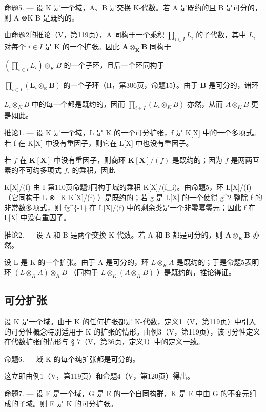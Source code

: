 命题5. --- 设 K 是一个域，A、B 是交换 K-代数。若 A 是既约的且 B 是可分的，则 A ⊗K B 是既约的。

由命题2的推论（V，第119页），A 同构于一个乘积 \(\prod_{i\in I}L_i\) 的子代数，其中 \(L_{i}\) 对每个 \(i\in I\) 是 K 的一个扩张。因此 \(\mathbf{A}\otimes_{\mathbf{K}}\mathbf{B}\) 同构于

\(\left(\prod_{i\in I}L_i\right)\otimes_K B\) 的一个子环，且后一个环同构于

\(\prod_{i\in I}(\mathbf{L}_i\otimes_{\mathbb{K}}\mathbf{B})\) 的一个子环（II，第306页，命题15）。由于 \(\mathbf{B}\) 是可分的，诸环

\(L_{i} \otimes_{K} B\) 中的每一个都是既约的，因而 \(\prod_{i \in I} (L_{i} \otimes_{K} B)\) 亦然，从而 \(A \otimes_{K} B\) 更是如此。

推论1. --- 设 K 是一个域，L 是 K 的一个可分扩张，f 是 K{[}X{]} 中的一个多项式。若 f 在 K{[}X{]} 中没有重因子，则它在 L{[}X{]} 中也没有重因子。

若 \(f\) 在 \(\mathbf{K}[\mathbf{X}]\) 中没有重因子，则商环 \(\mathbf{K}[\mathbf{X}] / (f)\) 是既约的；因为 \(f\) 是两两互素的不可约多项式 \(f_i\) 的乘积，因此

K{[}X{]}/(f) 由 I 第110页命题9同构于域的乘积 K{[}X{]}/(f\_i)。由命题5，环 L{[}X{]}/(f) （它同构于 L ⊗\_K K{[}X{]}/(f) ）是既约的；若 g 是 L{[}X{]} 的一个使得 g\^{}2 整除 f 的非常数多项式，则 fg\^{}\{-1\} 在 L{[}X{]}/(f) 中的剩余类是一个非零幂零元；因此 f 在 L{[}X{]} 中没有重因子。

推论2. --- 设 A 和 B 是两个交换 K-代数。若 A 和 B 都是可分的，则 \(\mathbf{A} \otimes_{\mathbf{K}} \mathbf{B}\) 亦然。

设 L 是 K 的一个扩张。由于 A 是可分的，环 \(L \otimes_{K} A\) 是既约的；于是命题5表明环 \((L \otimes_{K} A) \otimes_{K} B\) （同构于 \(L \otimes_{K} (A \otimes_{K} B)\) ）是既约的，推论得证。

\subsection{可分扩张}

设 K 是一个域。由于 K 的任何扩张都是 K-代数，定义1（V，第119页）中引入的可分性概念特别适用于 K 的扩张的情形。由例3（V，第119页），该可分性定义在代数扩张的情形与 § 7（V，第36页，定义1）中的定义一致。

命题6. --- 域 K 的每个纯扩张都是可分的。

这立即由例1（V，第119页）和命题4（V，第120页）得出。

命题7. --- 设 E 是一个域，G 是 E 的一个自同构群，K 是 E 中由 G 的不变元组成的子域。则 E 是 K 的可分扩张。

